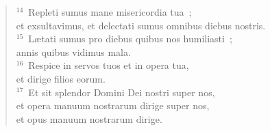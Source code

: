 \begin{flushleft}
\begin{verse}
${}^{14}$~Repleti sumus mane misericordia tua~;\\ et exsultavimus, et delectati sumus omnibus diebus nostris.\\
${}^{15}$~L\ae tati sumus pro diebus quibus nos humiliasti~;\\ annis quibus vidimus mala.\\
${}^{16}$~Respice in servos tuos et in opera tua,\\ et dirige filios eorum.\\
${}^{17}$~Et sit splendor Domini Dei nostri super nos,\\ et opera manuum nostrarum dirige super nos,\\ et opus manuum nostrarum dirige.\end{verse}\end{flushleft}



